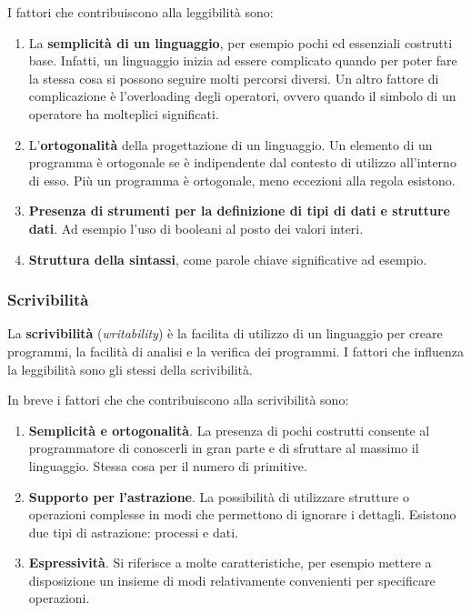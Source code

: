 \documentclass[a4paper]{article}
\begin{document}
	\noindent
	I fattori che contribuiscono alla leggibilità sono:
	\begin{enumerate}
		\item La \textbf{semplicità di un linguaggio}, per esempio pochi ed essenziali costrutti base. Infatti, un linguaggio inizia ad essere complicato quando per poter fare la stessa cosa si possono seguire molti percorsi diversi. Un altro fattore di complicazione è l'overloading degli operatori, ovvero quando il simbolo di un operatore ha molteplici significati.
		
		\item L'\textbf{ortogonalità} della progettazione di un linguaggio. Un elemento di un programma è ortogonale se è indipendente dal contesto di utilizzo all'interno di esso. Più un programma è ortogonale, meno eccezioni alla regola esistono.
		
		\item \textbf{Presenza di strumenti per la definizione di tipi di dati e strutture dati}. Ad esempio l'uso di booleani al posto dei valori interi.
		
		\item \textbf{Struttura della sintassi}, come parole chiave significative ad esempio.
	\end{enumerate}
	
	\subsubsection{Scrivibilità}
	
	La \textcolor{Red3}{\textbf{scrivibilità}} (\emph{writability}) è la facilita di utilizzo di un linguaggio per creare programmi, la facilità di analisi e la verifica dei programmi. I fattori che influenza la leggibilità sono gli stessi della scrivibilità.\newline
	
	\noindent
	In breve i fattori che che contribuiscono alla scrivibilità sono:
	\begin{enumerate}
		\item \textbf{Semplicità e ortogonalità}. La presenza di pochi costrutti consente al programmatore di conoscerli in gran parte e di sfruttare al massimo il linguaggio. Stessa cosa per il numero di primitive.
		
		\item \textbf{Supporto per l'astrazione}. La possibilità di utilizzare strutture o operazioni complesse in modi che permettono di ignorare i dettagli. Esistono due tipi di astrazione: processi e dati.
		
		\item \textbf{Espressività}. Si riferisce a molte caratteristiche, per esempio mettere a disposizione un insieme di modi relativamente convenienti per specificare operazioni.
	\end{enumerate}\newpage
	
\end{document}
